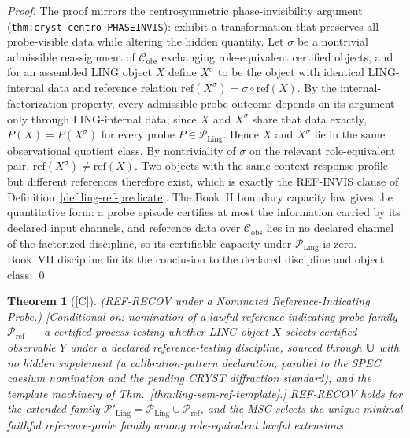 \documentclass[12pt,oneside]{amsbook}
\theoremstyle{plain}
\newtheorem{theorem}{Theorem}[section]
\theoremstyle{definition}
\theoremstyle{remark}
\newcommand{\status}[1]{\textup{[#1]}}
\begin{document}
\begin{proof}
The proof mirrors the centrosymmetric phase-invisibility argument
(\texttt{thm:cryst-centro-PHASEINVIS}): exhibit a transformation
that preserves all probe-visible data while altering the hidden
quantity.  Let $\sigma$ be a nontrivial admissible reassignment of
$\mathcal{C}_{\mathrm{obs}}$ exchanging role-equivalent certified
objects, and for an assembled LING object $X$ define $X^\sigma$ to
be the object with identical LING-internal data and reference
relation $\mathrm{ref}(X^\sigma) = \sigma \circ \mathrm{ref}(X)$.
By the internal-factorization property, every admissible probe
outcome depends on its argument only through LING-internal data;
since $X$ and $X^\sigma$ share that data exactly, $P(X) =
P(X^\sigma)$ for every probe $P \in \mathcal{P}_{\mathrm{Ling}}$.
Hence $X$ and $X^\sigma$ lie in the same observational quotient
class.  By nontriviality of $\sigma$ on the relevant
role-equivalent pair, $\mathrm{ref}(X^\sigma) \neq
\mathrm{ref}(X)$.  Two objects with the same context-response
profile but different references therefore exist, which is exactly
the REF-INVIS clause of Definition~\ref{def:ling-ref-predicate}.
The Book~II boundary capacity law gives the quantitative form: a
probe episode certifies at most the information carried by its
declared input channels, and reference data over
$\mathcal{C}_{\mathrm{obs}}$ lies in no declared channel of the
factorized discipline, so its certifiable capacity under
$\mathcal{P}_{\mathrm{Ling}}$ is zero.  Book~VII discipline limits
the conclusion to the declared discipline and object class. \qed
\end{proof}

\begin{theorem}[\status{C}]\label{thm:ling-REF-RECOV}
\textup{(REF-RECOV under a Nominated Reference-Indicating Probe.)}
\textup{[Conditional on: nomination of a lawful
\emph{reference-indicating probe family}
$\mathcal{P}_{\mathrm{ref}}$ --- a certified process testing
whether LING object $X$ selects certified observable $Y$ under a
declared reference-testing discipline, sourced through
$\mathbf{U}$ with no hidden supplement (a calibration-pattern
declaration, parallel to the SPEC caesium nomination and the
pending CRYST diffraction standard); and the template machinery of
Thm.~\ref{thm:ling-sem-ref-template}.]}
REF-RECOV holds for the extended family
$\mathcal{P}'_{\mathrm{Ling}} = \mathcal{P}_{\mathrm{Ling}} \cup
\mathcal{P}_{\mathrm{ref}}$, and the MSC selects the unique
minimal faithful reference-probe family among role-equivalent
lawful extensions.
\end{theorem}
\end{document}
